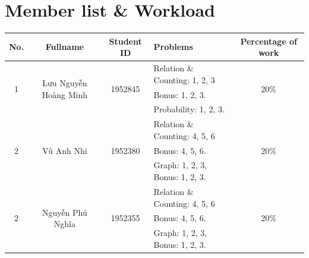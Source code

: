 \documentclass[a4paper]{article}
\begin{document}

\newpage
\tableofcontents
\newpage


\section{Member list \& Workload}

\begin{center}
  \begin{tabular}{|c|c|c|l|c|}
    \hline
    \textbf{No.}       & \textbf{Fullname}                      & \textbf{Student ID}      & \textbf{Problems}                             & \textbf{Percentage of work} \\
    \hline
    \multirow{3}{*}{1} & \multirow{3}{*}{Lưu Nguyễn Hoàng Minh} & \multirow{3}{*}{1952845} & \textendash{} Relation \& Counting: 1, 2, 3   & \multirow{3}{*}{20\%}       \\
                       &                                        &                          & Bonus: 1, 2, 3.                               &                             \\
                       &                                        &                          & \textendash{} Probability: 1, 2, 3.           &                             \\
    \hline
    \multirow{3}{*}{2} & \multirow{3}{*}{Vũ Anh Nhi}            & \multirow{3}{*}{1952380} & \textendash{} Relation \& Counting: 4, 5, 6   & \multirow{3}{*}{20\%}       \\
                       &                                        &                          & Bonus: 4, 5, 6.                               &                             \\
                       &                                        &                          & \textendash{} Graph: 1, 2, 3, Bonus: 1, 2, 3. &                             \\
    \hline
    \multirow{3}{*}{2} & \multirow{3}{*}{Nguyễn Phú Nghĩa}      & \multirow{3}{*}{1952355} & \textendash{} Relation \& Counting: 4, 5, 6   & \multirow{3}{*}{20\%}       \\
                       &                                        &                          & Bonus: 4, 5, 6.                               &                             \\
                       &                                        &                          & \textendash{} Graph: 1, 2, 3, Bonus: 1, 2, 3. &                             \\

\end{tabular}
\end{center}
\end{document}
